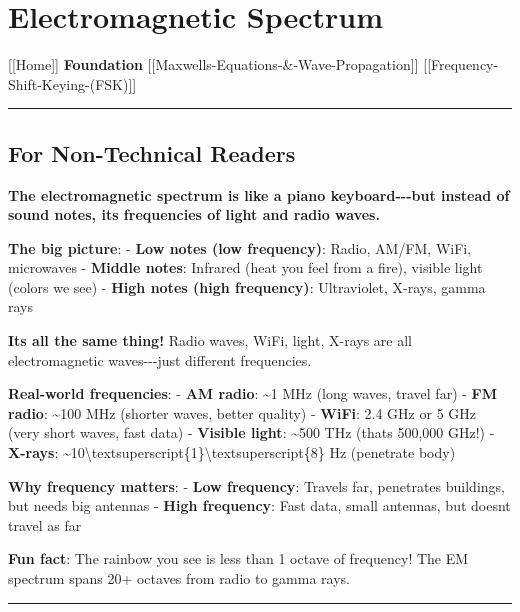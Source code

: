 \section{Electromagnetic Spectrum}\label{electromagnetic-spectrum}

{[}{[}Home{]}{]} \textbar{} \textbf{Foundation} \textbar{}
{[}{[}Maxwell\textquotesingle s-Equations-\&-Wave-Propagation{]}{]}
\textbar{} {[}{[}Frequency-Shift-Keying-(FSK){]}{]}

\begin{center}\rule{0.5\linewidth}{0.5pt}\end{center}

\subsection{\texorpdfstring{ For Non-Technical
Readers}{ For Non-Technical Readers}}\label{for-non-technical-readers}

\textbf{The electromagnetic spectrum is like a piano keyboard-\/-\/-but
instead of sound notes, it\textquotesingle s frequencies of light and
radio waves.}

\textbf{The big picture}: - \textbf{Low notes (low frequency)}: Radio,
AM/FM, WiFi, microwaves - \textbf{Middle notes}: Infrared (heat you feel
from a fire), visible light (colors we see) - \textbf{High notes (high
frequency)}: Ultraviolet, X-rays, gamma rays

\textbf{It\textquotesingle s all the same thing!} Radio waves, WiFi,
light, X-rays are all electromagnetic waves-\/-\/-just different
frequencies.

\textbf{Real-world frequencies}: - \textbf{AM radio}: \textasciitilde1
MHz (long waves, travel far) - \textbf{FM radio}: \textasciitilde100 MHz
(shorter waves, better quality) - \textbf{WiFi}: 2.4 GHz or 5 GHz (very
short waves, fast data) - \textbf{Visible light}: \textasciitilde500 THz
(that\textquotesingle s 500,000 GHz!) - \textbf{X-rays}:
\textasciitilde10\textbackslash textsuperscript\{1\}\textbackslash textsuperscript\{8\}
Hz (penetrate body)

\textbf{Why frequency matters}: - \textbf{Low frequency}: Travels far,
penetrates buildings, but needs big antennas - \textbf{High frequency}:
Fast data, small antennas, but doesn\textquotesingle t travel as far

\textbf{Fun fact}: The rainbow you see is less than 1 octave of
frequency! The EM spectrum spans 20+ octaves from radio to gamma rays.

\begin{center}\rule{0.5\linewidth}{0.5pt}\end{center}

